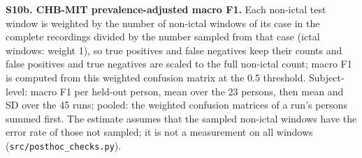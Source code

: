 \documentclass[11pt,a4paper]{article}
\begin{document}
\endgroup

\textbf{S10b. CHB-MIT prevalence-adjusted macro F1.} Each non-ictal test window is weighted by
the number of non-ictal windows of its case in the complete recordings divided by the
number sampled from that case (ictal windows: weight 1), so true
positives and false negatives keep their counts and false positives and true negatives
are scaled to the full non-ictal count; macro F1 is computed from this weighted
confusion matrix at the 0.5 threshold. Subject-level: macro F1 per held-out person, mean
over the 23 persons, then mean and SD over the 45 runs; pooled: the weighted confusion
matrices of a run's persons summed first. The estimate assumes that the sampled
non-ictal windows have the error rate of those not sampled; it is not a measurement on
all windows (\nolinkurl{src/posthoc_checks.py}).

\begingroup\footnotesize\setlength{\tabcolsep}{3pt}
\end{document}
